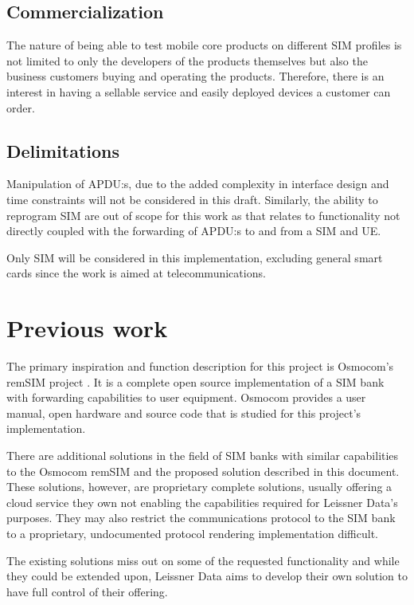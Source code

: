 \subsection{Commercialization}

The nature of being able to test mobile core products on different
SIM profiles is not limited to only the developers of the products
themselves but also the business customers buying and operating the
products. Therefore, there is an interest in having a sellable
service and easily deployed devices a customer can order.

\subsection{Delimitations}

Manipulation of APDU:s, due to the added complexity in interface
design and time constraints will not be considered in this draft.
Similarly, the ability to reprogram SIM are out of scope for this
work as that relates to functionality not directly coupled with
the forwarding of APDU:s to and from a SIM and UE.

Only SIM will be considered in this implementation, excluding
general smart cards since the work is aimed at telecommunications.

\section{Previous work}

The primary inspiration and function description for this project
is Osmocom's remSIM project \cite{osmocom-remsim}. It is a
complete open source implementation of a SIM bank with forwarding
capabilities to user equipment. Osmocom provides a user manual,
open hardware and source code that is studied for this project's
implementation.

There are additional solutions in the field of SIM banks with
similar capabilities to the Osmocom remSIM and the proposed
solution described in this document. These solutions, however, are
proprietary \cite{polygator-sim-bank} complete solutions, usually
offering a cloud service they own \cite{placeholder-source-cloud-sim-bank}
not enabling the capabilities required for Leissner Data's purposes.
They may also restrict the communications protocol to the SIM bank
to a proprietary, undocumented protocol rendering implementation
difficult.

The existing solutions miss out on some of the requested
functionality and while they could be extended upon, Leissner Data
aims to develop their own solution to have full control of their
offering.


